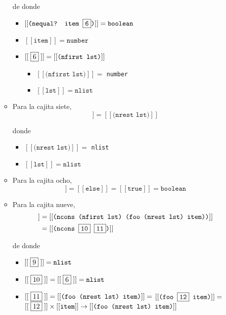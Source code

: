 \documentclass[letterpaper,11pt]{article}
\begin{document}
\begin{enumerate}
\begin{itemize}
        de donde 
        \begin{itemize}
            \item $[[\texttt{(nequal? item \fbox{6})}]] = \texttt{boolean}$
            \item $[[\texttt{item}]] = \texttt{number}$
            \item $[[\;\fbox{6}\;]] = [[\texttt{(nfirst lst)}]]$
            \begin{itemize}
                \item $[[\texttt{(nfirst lst)}]] =$ \texttt{number}
                \item $[[\texttt{lst}]] = \texttt{nlist}$
            \end{itemize}
        \end{itemize}

        \item Para la cajita siete, 
        \begin{equation*}
            [[\;\fbox{7}\;]] = [[\texttt{(nrest lst)}]]
        \end{equation*}

        donde 
        \begin{itemize}
            \item $[[\texttt{(nrest lst)}]] =$ \texttt{nlist}
            \item $[[\texttt{lst}]] = \texttt{nlist}$
        \end{itemize}

        \item Para la cajita ocho,
        \begin{equation*}
            [[8]] = [[\texttt{else}]] = [[\texttt{true}]] = \texttt{boolean}
        \end{equation*}

        \item Para la cajita nueve,
        \begin{align*}
            [[\;\fbox{9}\;]]
            &= [[\texttt{(ncons (nfirst lst) (foo (nrest lst) item))}]] \\ 
            &= [[\texttt{(ncons \fbox{10} \fbox{11})}]] 
        \end{align*}

        de donde 
        \begin{itemize}
            \item $[[\;\fbox{9}\;]] = \texttt{nlist}$
            \item $[[\;\fbox{10}\;]] = [[\;\fbox{6}\;]] = \texttt{nlist}$
            \item $[[\;\fbox{11} \;]] = [[\texttt{(foo (nrest lst) item)}]] = $
            $[[\texttt{(foo \fbox{12} item)}]] =$ \\ 
            $[[\;\fbox{12}\;]] \times [[\texttt{item}]] \rightarrow 
            [[\texttt{(foo (nrest lst) item)}]]$


\end{itemize}
\end{itemize}
\end{enumerate}
\end{document}

